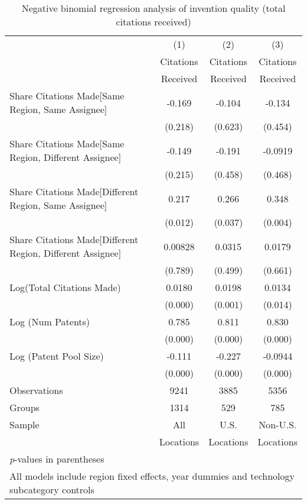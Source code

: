 {
\def\sym#1{\ifmmode^{#1}\else\(^{#1}\)\fi}
\begin{longtable}{l*{3}{c}}
\caption{Negative binomial regression analysis of invention quality (total citations received) \label{model123}}\\
\hline\hline\endfirsthead\hline\endhead\hline\endfoot\endlastfoot
                &\multicolumn{1}{c}{(1)}&\multicolumn{1}{c}{(2)}&\multicolumn{1}{c}{(3)}\\
                &\multicolumn{1}{c}{Citations}&\multicolumn{1}{c}{Citations}&\multicolumn{1}{c}{Citations}\\
                 &\multicolumn{1}{c}{Received}&\multicolumn{1}{c}{Received}&\multicolumn{1}{c}{Received}\\
\hline
Share Citations Made[Same Region, Same Assignee]&   -0.169         &   -0.104         &   -0.134         \\
                &  (0.218)         &  (0.623)         &  (0.454)         \\
Share Citations Made[Same Region, Different Assignee]&   -0.149         &   -0.191         &  -0.0919         \\
                &  (0.215)         &  (0.458)         &  (0.468)         \\
Share Citations Made[Different Region, Same Assignee]&    0.217  &    0.266  &    0.348 \\
                &  (0.012)         &  (0.037)         &  (0.004)         \\
Share Citations Made[Different Region, Different Assignee]&  0.00828         &   0.0315         &   0.0179         \\
                &  (0.789)         &  (0.499)         &  (0.661)         \\
Log(Total Citations Made)&   0.0180&   0.0198&   0.0134  \\
                &  (0.000)         &  (0.001)         &  (0.014)         \\
Log (Num Patents)&    0.785&    0.811&    0.830\\
                &  (0.000)         &  (0.000)         &  (0.000)         \\
Log (Patent Pool Size)&   -0.111&   -0.227&  -0.0944\\
                &  (0.000)         &  (0.000)         &  (0.000)         \\
\hline
Observations&9241&3885&5356         \\
Groups&1314&529&785\\
Sample&All &U.S. &Non-U.S. \\
          &Locations &Locations&Locations \\
\hline\hline
\multicolumn{4}{l}{\small \textit{p}-values in parentheses}\\
\multicolumn{4}{l}{\small All models include region fixed effects, year dummies and technology subcategory controls}\\
\end{longtable}
}
